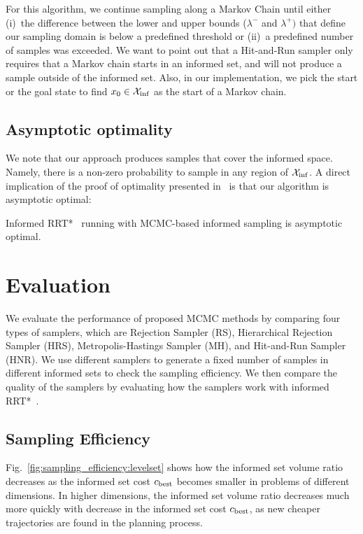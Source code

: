 \documentclass[letterpaper, 10 pt, conference]{ieeeconf}  %
\begin{document}
For this algorithm, we continue sampling along a Markov Chain until either 
(i)~the difference between the lower and upper bounds ($\lambda^-$ and $\lambda^+)$ 
that define our sampling domain is below a predefined threshold or
(ii)~a predefined number of samples was exceeded.
We want to point out that a Hit-and-Run sampler only requires that a Markov chain starts in an informed set, and will not produce a sample outside of the informed set.
Also, in our implementation, we pick the start or the goal state to find $ x_0 \in \mathcal{X}_{\rm {inf}} $ as the start of a Markov chain.



\subsection{Asymptotic optimality}
We note that our approach produces samples that cover the informed space. 
Namely, there is a non-zero probability to sample in any region of $\mathcal{X}_{\rm {inf}}$.
A direct implication of the proof of optimality presented in~\cite{KF11} is that our algorithm is asymptotic optimal:

\begin{prop}
	\label{prop:asym_opt}
	Informed RRT*~\cite{GSB14} running with MCMC-based informed sampling is asymptotic optimal.	
\end{prop}

\section{Evaluation}
\label{sec:eval}

We evaluate the performance of proposed MCMC methods by comparing four types of samplers, which are Rejection Sampler (RS), Hierarchical Rejection Sampler (HRS), Metropolis-Hastings Sampler (MH), and Hit-and-Run Sampler (HNR).
We use different samplers to generate a fixed number of samples in different informed sets to check the sampling efficiency. %
We then compare the quality of the samplers by evaluating how the samplers work with informed RRT*~\cite{GSB14}.

\subsection{Sampling Efficiency}

Fig.~\ref{fig:sampling_efficiency:levelset} shows how the informed set volume ratio decreases as the informed set cost $ c_{\rm best} $ becomes smaller in problems of different dimensions.
In higher dimensions, the informed set volume ratio decreases much more quickly with decrease in the informed set cost $ c_{\rm best} $, as new cheaper trajectories are found in the planning process.
\end{document}
